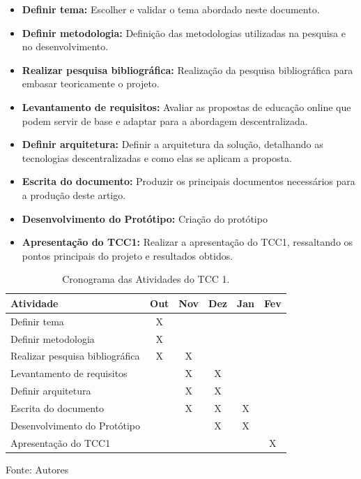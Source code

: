 \begin{itemize}
    \item \textbf{Definir tema:} Escolher e validar o tema abordado neste documento.
    \item \textbf{Definir metodologia:} Definição das metodologias utilizadas na pesquisa e no desenvolvimento.
    \item \textbf{Realizar pesquisa bibliográfica:} Realização da pesquisa bibliográfica para embasar teoricamente o projeto.
    \item \textbf{Levantamento de requisitos:} Avaliar as propostas de educação online que podem servir de base e adaptar para a abordagem descentralizada.
    \item \textbf{Definir arquitetura:} Definir a arquitetura da solução, detalhando as tecnologias descentralizadas e como elas se aplicam a proposta.
    \item \textbf{Escrita do documento:} Produzir os principais documentos necessários para a produção deste artigo.
    \item \textbf{Desenvolvimento do Protótipo:} Criação do protótipo 
    \item \textbf{Apresentação do TCC1:} Realizar a apresentação do TCC1, ressaltando os pontos principais do projeto e resultados obtidos.
\end{itemize}

\begin{table}[h]
    \centering
    \caption{Cronograma das Atividades do TCC 1.}
    \label{tab:cronograma_tcc1}
    \begin{adjustbox}{width=\textwidth}
    \begin{tabular}{|l|c|c|c|c|c|}
        \hline
        \textbf{Atividade} & \textbf{Out} & \textbf{Nov} & \textbf{Dez} & \textbf{Jan} & \textbf{Fev} \\
        \hline
        Definir tema & X &  &  &  &  \\
        Definir metodologia & X &  &  &  &  \\
        Realizar pesquisa bibliográfica & X & X &  &  &  \\
        Levantamento de requisitos &  & X & X &  &  \\
        Definir arquitetura &  & X & X &  &  \\
        Escrita do documento &  & X & X & X &  \\
        Desenvolvimento do Protótipo &  &  & X & X &  \\
        Apresentação do TCC1 &  &  &  &  & X \\
        \hline
    \end{tabular}
    \end{adjustbox}
    \vspace{5mm}
    {\footnotesize Fonte: Autores}
\end{table}

